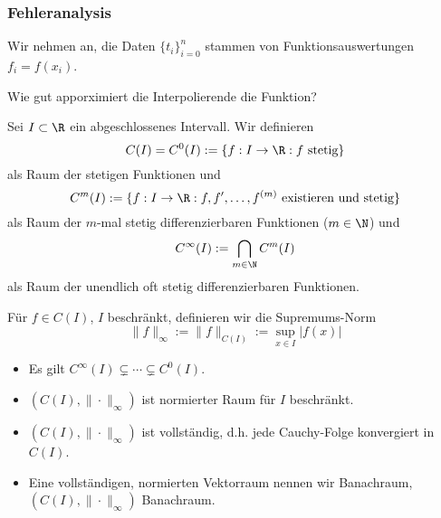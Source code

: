 \documentclass[a4paper,11pt]{scrartcl}
\begin{document}
\subsubsection{Fehleranalysis}

Wir nehmen an, die Daten $\{t_i\}_{i=0}^n$ stammen von Funktionsauswertungen $f_i=f(x_i)$.

Wie gut apporximiert die Interpolierende die Funktion?

\begin{df}
	\label{1.9}
	Sei $I\subset \R$ ein abgeschlossenes Intervall.
	Wir definieren
	\[
		C(I) = C^0(I) := \{f: I\to \R : f \text{ stetig}\}
	\]
	als Raum der stetigen Funktionen und
	\[
		C^m(I) := \{f: I\to \R : f,f',\dotsc,f^{(m)} \text{ existieren und stetig}\}
	\]
	als Raum der $m$-mal stetig differenzierbaren Funktionen ($m\in \N$) und
	\[
		C^\infty(I) := \bigcap_{m\in \N}C^m (I)
	\]
	als Raum der unendlich oft stetig differenzierbaren Funktionen.

	Für $f\in C(I)$, $I$ beschränkt, definieren wir die Supremums-Norm
	\[
		\|f\|_\infty := \|f\|_{C(I)} := \sup_{x\in I}|f(x)|
	\]
\end{df}

\begin{note}
	\begin{itemize}
		\item 
			Es gilt $C^\infty(I) \subsetneq \dotsb \subsetneq C^0(I)$.
		\item
			$(C(I), \|\cdot\|_\infty)$ ist normierter Raum für $I$ beschränkt.
		\item
			$(C(I),\|\cdot\|_\infty)$ ist vollständig, d.h. jede Cauchy-Folge konvergiert in $C(I)$.
		\item
			Eine vollständigen, normierten Vektorraum nennen wir Banachraum, $(C(I),\|\cdot\|_\infty)$ Banachraum.
	\end{itemize}
\end{note}
\end{document}
